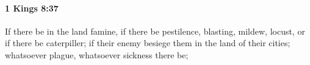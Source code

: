 
		\paragraph{1 Kings 8:37} %
			\label{1KINGS-8-37}

			If there be in the land famine, if there be pestilence, blasting, mildew, locust, or if there be caterpiller; if their enemy besiege them in the land of their cities; whatsoever plague, whatsoever sickness there be;


